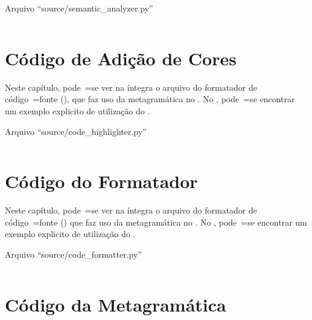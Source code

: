 \begin{code}
\caption{Arquivo ``source/semantic\_analyzer.py''}
\label{code:semanticAnalyzerPy}
\inputminted[firstline=39,firstnumber=1]{python3}{../source/semantic_analyzer.py}
\end{code}


\chapter{Código de Adição de Cores}

Neste capítulo,
pode~=se ver na íntegra o arquivo do formatador de código~=fonte (),
que faz uso da metagramática no .
No ,
pode~=se encontrar um exemplo explicito de utilização do .
\begin{code}
\caption{Arquivo ``source/code\_highlighter.py''}
\label{code:codeHighlighterPy}
\inputminted[firstline=39,firstnumber=1]{python3}{../source/code_highlighter.py}
\end{code}


\chapter{Código do Formatador}
\label{chapter:codigoDoFormatador}

Neste capítulo,
pode~=se ver na íntegra o arquivo do formatador de código~=fonte () que faz uso da metagramática no .
No ,
pode~=se encontrar um exemplo explicito de utilização do .
\begin{code}
\caption{Arquivo ``source/code\_formatter.py''}
\label{code:codeFormatterPy}
\inputminted[firstline=39,firstnumber=1]{python3}{../source/code_formatter.py}
\end{code}


\chapter{Código da Metagramática}
\label{chapter:codigoDaMetagramatica}

